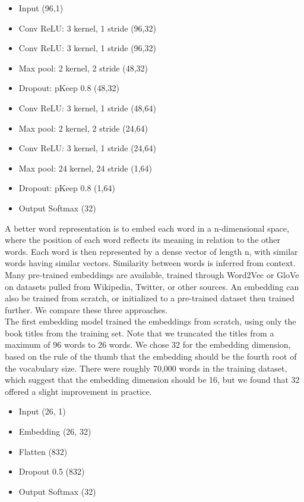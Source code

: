 \documentclass[jou,apacite, 10px]{apa6}
\begin{document}
\begin{itemize}
    \item Input (96,1)
    \item Conv ReLU: 3 kernel, 1 stride (96,32)
    \item Conv ReLU: 3 kernel, 1 stride (96,32)
    \item Max pool: 2 kernel, 2 stride (48,32)
    \item Dropout: pKeep 0.8 (48,32)
    \item Conv ReLU: 3 kernel, 1 stride (48,64)
    \item Max pool: 2 kernel, 2 stride (24,64)
    \item Conv ReLU: 3 kernel, 1 stride (24,64)
    \item Max pool: 24 kernel, 24 stride (1,64)
    \item Dropout: pKeep 0.8 (1,64)
    \item Output Softmax (32)
\end{itemize}\rule{0pt}{4ex}
A better word representation is to embed each word in a n-dimensional space, where the position of each word reflects its meaning in relation to the other words. Each word is then represented by a dense vector of length n, with similar words having similar vectors. Similarity between words is inferred from context. Many pre-trained embeddings are available, trained through Word2Vec or GloVe on datasets pulled from Wikipedia, Twitter, or other sources. An embedding can also be trained from scratch, or initialized to a pre-trained dataset then trained further. We compare these three approaches.\\
The first embedding model trained the embeddings from scratch, using only the book titles from the training set. Note that we truncated the titles from a maximum of 96 words to 26 words. We chose 32 for the embedding dimension, based on the rule of the thumb that the embedding should be the fourth root of the vocabulary size. There were roughly 70,000 words in the training dataset, which suggest that the embedding dimension should be 16, but we found that 32 offered a slight improvement in practice.
\begin{itemize}
    \item Input (26, 1)
    \item Embedding (26, 32)
    \item Flatten (832)
    \item Dropout 0.5 (832)
    \item Output Softmax (32)
\end{itemize}
\end{document}
